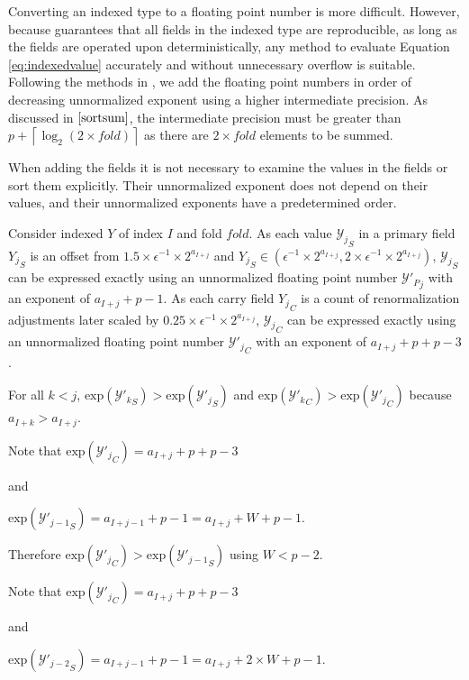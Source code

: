\documentclass[12pt]{article}
\providecommand{\ceil}[1]{\left \lceil #1 \right \rceil }
\providecommand{\exp}{\ensuremath{\text{exp}}}
\theoremstyle{plain}
\begin{document}
    Converting an indexed type to a floating point number is more difficult. However, because \cite{repsum} guarantees that all fields in the indexed type are reproducible, as long as the fields are operated upon deterministically, any method to evaluate Equation \ref{eq:indexedvalue} accurately and without unnecessary overflow is suitable. Following the methods in \cite{sortsum}, we add the floating point numbers in order of decreasing unnormalized exponent using a higher intermediate precision. As discussed in $\cite{sortsum}$, the intermediate precision must be greater than $p + \ceil{\log_2(2 \times fold)}$ as there are $2 \times fold$ elements to be summed.

    When adding the fields it is not necessary to examine the values in the fields or sort them explicitly. Their unnormalized exponent does not depend on their values, and their unnormalized exponents have a predetermined order.

    Consider indexed $Y$ of index $I$ and fold $fold$.
    As each value ${\mathcal{Y}_j}_S$ in a primary field ${Y_j}_S$ is an offset from $1.5 \times \epsilon^{-1} \times 2^{a_{I + j}}$ and ${Y_j}_S \in (\epsilon^{-1} \times 2^{a_{I + j}}, 2 \times \epsilon^{-1} \times 2^{a_{I + j}})$, ${\mathcal{Y}_j}_S$ can be expressed exactly using an unnormalized floating point number ${\mathcal{Y}'_P}_j$ with an exponent of $a_{I + j} + p - 1$.
    As each carry field ${Y_j}_C$ is a count of renormalization adjustments later scaled by $0.25 \times \epsilon^{-1} \times 2^{a_{I + j}}$, ${\mathcal{Y}_j}_C$ can be expressed exactly using an unnormalized floating point number ${\mathcal{Y}'_j}_C$ with an exponent of $a_{I + j} + p + p - 3$.

    For all $k < j$, $\exp({\mathcal{Y}'_k}_S) > \exp({\mathcal{Y}'_j}_S)$ and $\exp({\mathcal{Y}'_k}_C) > \exp({\mathcal{Y}'_j}_C)$ because $a_{I + k} > a_{I + j}$.

    Note that $\exp({\mathcal{Y}'_j}_C) = a_{I + j} + p + p - 3$

    and

    $\exp({\mathcal{Y}'_{j - 1}}_S) = a_{I + j - 1} + p - 1 = a_{I + j} + W + p - 1$.

    Therefore $\exp({\mathcal{Y}'_j}_C) > \exp({\mathcal{Y}'_{j - 1}}_S)$ using $W < p - 2$.

    Note that $\exp({\mathcal{Y}'_j}_C) = a_{I + j} + p + p - 3$

    and

    $\exp({\mathcal{Y}'_{j - 2}}_S) = a_{I + j - 1} + p - 1 = a_{I + j} + 2\times W + p - 1$.
\end{document}
